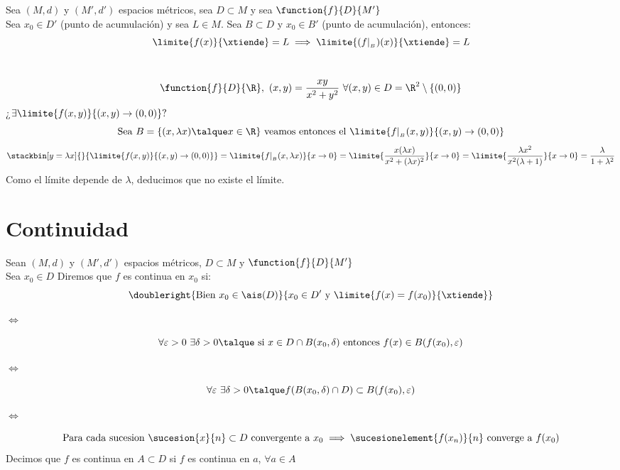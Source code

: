 	\begin{proposicion} Sea $(M,d)$ y $(M',d')$ espacios métricos, sea $D\subset M$ y sea $\function{f}{D}{M'}$\\ Sea $x_0\in D'$ (punto de acumulación) y sea $L\in M$. Sea $B\subset D$ y $x_0\in B'$ (punto de acumulación), entonces:\\
	\[\limite{f(x)}{\xtiende}=L\implies \limite{(f|_{_B})(x)}{\xtiende}=L\]
	\end{proposicion}
	
	\begin{ejem}\ \\
	\[\function{f}{D}{\R},\ (x,y)=\dfrac{xy}{x^2+y^2}\ \forall(x,y)\in D=\R^2\setminus\{(0,0)\}\]
	¿$\exists\limite{f(x,y)}{(x,y)\rightarrow(0,0)}?$
	\[\mathrm{Sea\ } B=\{(x,\lambda x)\talque x\in\R\}\ \mathrm{veamos\ entonces\ el\ }\limite{f|_{_B}(x,y)}{(x,y)\rightarrow(0,0)}\]
	\[\stackbin[y=\lambda x]{}{\limite{f(x,y)}{(x,y)\rightarrow(0,0)}}=\limite{f|_{_B}(x,\lambda x)}{x\rightarrow 0}=\limite{\dfrac{x(\lambda x)}{x^2+(\lambda x)^2}}{x\rightarrow 0}=\limite{\dfrac{\lambda x^2}{x^2(\lambda + 1)}}{x\rightarrow 0}=\dfrac{\lambda}{1+\lambda^2}\]
	Como el límite depende de $\lambda$, deducimos que no existe el límite.
	\end{ejem}
	
	\section{Continuidad}
	
	\begin{defi}Sean $(M,d)$ y $(M',d')$ espacios métricos, $D\subset M$ y $\function{f}{D}{M'}$\\
	Sea $x_0\in D$ Diremos que $f$ es continua en $x_0$ si:\\
	\[\doubleright{\mathrm{Bien\ } x_0\in \ais(D)}{x_0\in D'\mathrm{\ y\ } \limite{f(x)=f(x_0)}{\xtiende}}\]
	\begin{center}	$\iff$	\end{center}
	\[\forall\varepsilon>0\ \exists\delta>0\talque\mathrm{\ si\ } x\in D\cap B(x_0,\delta)\mathrm{\ entonces\ } f(x)\in B(f(x_0),\varepsilon) \]
	\begin{center}	$\iff$	\end{center}
	\[\forall\varepsilon\ \exists\delta>0\talque f(B(x_0,\delta)\cap D)\subset B(f(x_0),\varepsilon)\]
	\begin{center}	$\iff$	\end{center}
	\[\mathrm{Para\ cada\ sucesion\ }\sucesion{x}{n}\subset D\mathrm{\ convergente\ a\ }x_0\implies\sucesionelement{f(x_n)}{n}\mathrm{\ converge\ a\ }f(x_0)\]
	Decimos que $f$ es continua en $A\subset D$ si $f$ es continua en $a$, $\forall a\in A$
	\end{defi}
	

